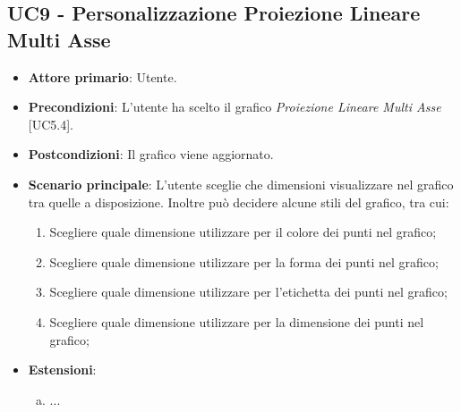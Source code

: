 \subsection{UC9 - Personalizzazione Proiezione Lineare Multi Asse}
\begin{itemize}
	\item \textbf{Attore primario}: Utente.
	
	\item \textbf{Precondizioni}: L'utente ha scelto il grafico \textit{Proiezione Lineare Multi Asse} [UC5.4].
	
	\item \textbf{Postcondizioni}: Il grafico viene aggiornato.
	
	\item \textbf{Scenario principale}: L'utente sceglie che dimensioni visualizzare nel grafico tra quelle a disposizione. Inoltre può decidere alcune stili del grafico, tra cui:
		\begin{enumerate}
			\item Scegliere quale dimensione utilizzare per il colore dei punti nel grafico;
				
			\item Scegliere quale dimensione utilizzare per la forma dei punti nel grafico;
			
			\item Scegliere quale dimensione utilizzare per l'etichetta dei punti nel grafico;
			
			\item Scegliere quale dimensione utilizzare per la dimensione dei punti nel grafico;
				
		\end{enumerate}
		
	\item \textbf{Estensioni}:
	\begin{enumerate}[(a)]
		\item ...
	\end{enumerate}
\end{itemize}